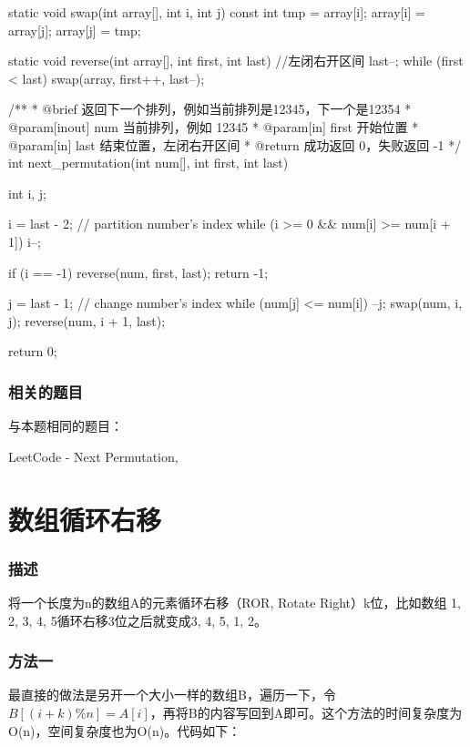 \begin{Codex}[label=next_permutation.c]
static void swap(int array[], int i, int j) {
    const int tmp = array[i];
    array[i] = array[j];
    array[j] = tmp;
}

static void reverse(int array[], int first, int last) { //左闭右开区间
    last--;
    while (first < last)
        swap(array, first++, last--);
}

/**
 * @brief 返回下一个排列，例如当前排列是12345，下一个是12354
 * @param[inout] num 当前排列，例如 12345
 * @param[in] first 开始位置
 * @param[in] last 结束位置，左闭右开区间
 * @return 成功返回 0，失败返回 -1
 */
int next_permutation(int num[], int first, int last) {
    int i, j;

    i = last - 2;  // partition number's index
    while (i >= 0 && num[i] >= num[i + 1])
        i--;

    if (i == -1) {
        reverse(num, first, last);
        return -1;
    }

    j = last - 1;  // change number's index
    while (num[j] <= num[i])
        --j;
    swap(num, i, j);
    reverse(num, i + 1, last);

    return 0;
}
\end{Codex}

\subsubsection{相关的题目}
与本题相同的题目：
\begindot
\item LeetCode -  Next Permutation, 
\myenddot


\section{数组循环右移} %

\subsubsection{描述}
将一个长度为n的数组A的元素循环右移（ROR, Rotate Right）k位，比如数组 {1, 2, 3, 4, 5}循环右移3位之后就变成{3, 4, 5, 1, 2}。

\subsubsection{方法一}
最直接的做法是另开一个大小一样的数组B，遍历一下，令$B[(i + k) \% n] = A[i]$，再将B的内容写回到A即可。这个方法的时间复杂度为O(n)，空间复杂度也为O(n)。代码如下：

